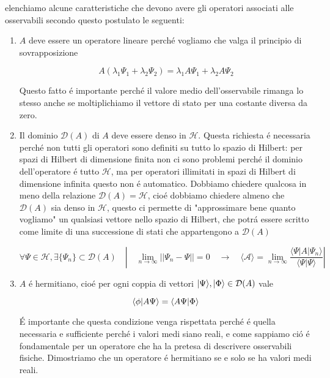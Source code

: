 elenchiamo alcune caratteristiche che devono avere gli operatori associati alle osservabili secondo questo postulato le seguenti:
\begin{enumerate}
\item $A$ deve essere un operatore lineare perch\'e vogliamo che valga il principio di sovrapposizione

$$A(\lambda_{1}\Psi_{1}+\lambda_{2}\Psi_{2})=\lambda_{1}A\Psi_{1}+\lambda_{2}A\Psi_{2}$$

Questo fatto \'e importante perch\'e il valore medio dell'osservabile rimanga lo stesso anche se moltiplichiamo il vettore di stato per una costante diversa da zero.

\item Il dominio $\mathcal{D}(A)$ di $A$ deve essere denso in $\mathcal{H}$. Questa richiesta \'e necessaria perch\'e non tutti gli operatori sono definiti su tutto lo spazio di Hilbert: per spazi di Hilbert di dimensione finita non ci sono problemi perch\'e il dominio dell'operatore \'e tutto $\mathcal{H}$, ma per operatori illimitati in spazi di Hilbert di dimensione infinita questo non \'e automatico. Dobbiamo chiedere qualcosa in meno della relazione $\mathcal{D}(A) = \mathcal{H}$, cio\'e dobbiamo chiedere almeno che $\mathcal{D}(A)$ sia denso in $\mathcal{H}$, questo ci permette di "approssimare bene quanto vogliamo" un qualsiasi vettore nello spazio di Hilbert, che potr\'a essere scritto come limite di una successione di stati che appartengono a $\mathcal{D}(A)$

$$\forall\Psi\in\mathcal{H},\exists\{\Psi_{n}\}\subset\mathcal{D}(A)\quad\left|\quad\lim_{n\to\infty}||\Psi_{n}-\Psi||=0\quad\longrightarrow\quad\langle\mathcal{A}\rangle=\lim_{n\to\infty}\frac{\langle\Psi|A|\Psi_{n}\rangle}{\langle\Psi|\Psi\rangle}\right|$$

\item $A$ \'e hermitiano, cio\'e per ogni coppia di vettori $\normalsize| \Psi \normalsize\rangle, \normalsize| \Phi \normalsize\rangle \in \mathcal{D}(A)$ vale

$$\normalsize\langle \phi \normalsize| A\Psi \normalsize\rangle = \normalsize\langle A\Psi \normalsize| \Phi \normalsize\rangle$$

\'E importante che questa condizione venga rispettata perch\'e \'e quella necessaria e sufficiente perch\'e i valori medi siano reali, e come sappiamo ci\'o \'e fondamentale per un operatore che ha la pretesa di descrivere osservabili fisiche. Dimostriamo che un operatore \'e hermitiano se e solo se ha valori medi reali.

\begin{comment}
Dimostrazione. Consideriamo il caso semplificato |\Psii = |Φi che non fa perdere di generalit'a, e dimostriamo che h\Psi|A|\Psii ∈ R
h\Psi|A\Psii = hA\Psi|\Psii
∗prop.t'a prodotto scalare h\Psi|A\Psii = hA\Psi|\Psii definizione di hermitiano*−→ h*A\Psi|\Psii
∗ = hA\Psi|\Psii definizione di valor medio reale Mostriamo ora il viceversa, cio'e che a valori medi reali corrispondono operatori hermitiani. Consideriamo uno stato |\Psii e scriviamolo come combinazione di altri due stati di cui uno moltiplicato per un fattore di fase non banale


\end{comment}
\end{enumerate}
